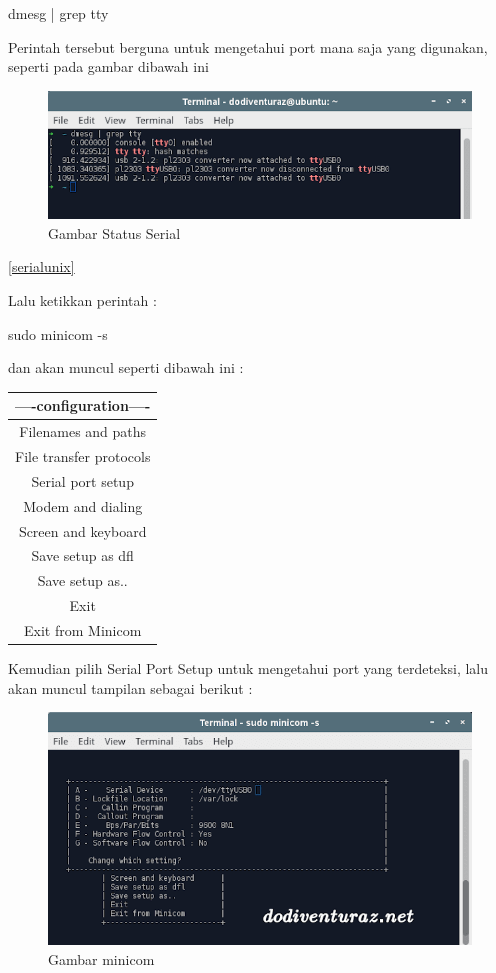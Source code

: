 	dmesg | grep tty
	
	Perintah tersebut berguna untuk mengetahui port mana saja yang digunakan, seperti pada gambar dibawah ini
	
	\begin{figure} [ht]
	\centerline{\includegraphics[width=1\textwidth]{figures/serialunix.png}}
	\caption{Gambar Status Serial}
	\label{statusserial}
	\end{figure}
	
	\ref{serialunix}
	
	Lalu ketikkan perintah :
	
	sudo minicom -s
	
	dan akan muncul seperti dibawah ini :
	
	\begin{table}[H]
		\begin{tabular}{|c|}
			\hline
			----configuration----\\
			\hline
			Filenames and paths\\
			\hline
			File transfer protocols\\
			\hline
			Serial port setup\\
			\hline
			Modem and dialing\\
			\hline
			Screen and keyboard\\
			\hline
			Save setup as dfl\\
			\hline
			Save setup as..\\
			\hline
			Exit\\
			\hline
			Exit from Minicom\\
		\end{tabular}
	\end{table}
	
	Kemudian pilih Serial Port Setup untuk mengetahui port yang terdeteksi, lalu akan muncul tampilan sebagai berikut :
	
	\begin{figure} [ht]
	\centerline{\includegraphics[width=1\textwidth]{figures/minicom.png}}
	\caption{Gambar minicom}
	\label{minicom}
	\end{figure}
	

